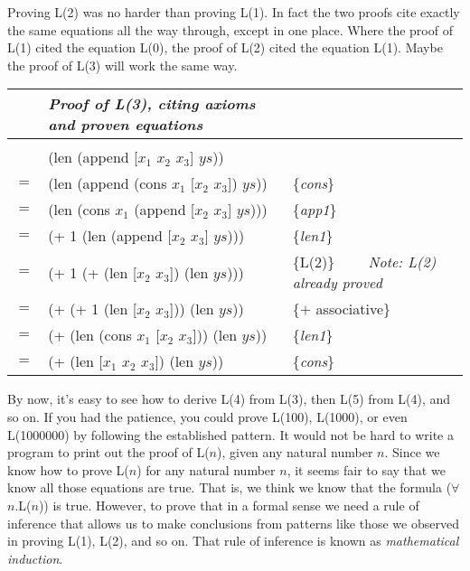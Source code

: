Proving L(2) was no harder than proving L(1).
In fact the two proofs cite exactly the same equations all the way through,
except in one place.
Where the proof of L(1) cited the equation L(0),
the proof of L(2) cited the equation L(1).
Maybe the proof of L(3) will work the same way.
\begin{center}
\begin{tabular}{lll}
&\emph{Proof of L(3), citing axioms and proven equations}&\\
\hline\\[-1.0em]
    & \textsf{(len (append [$x_1$ $x_2$ $x_3$] $ys$))}         &                     \\
$=$ & \textsf{(len (append (cons $x_1$ [$x_2$ $x_3$]) $ys$))}  & \{\emph{cons}\}     \\
$=$ & \textsf{(len (cons $x_1$ (append [$x_2$ $x_3$] $ys$)))}  & \{\emph{app1}\}     \\
$=$ & \textsf{(+ 1 (len (append [$x_2$ $x_3$] $ys$)))}         & \{\emph{len1}\}     \\
$=$ & \textsf{(+ 1 (+ (len [$x_2$ $x_3$]) (len $ys$)))}        & \{L(2)\} ~~~~\emph{Note: L(2) already proved}\\
$=$ & \textsf{(+ (+ 1 (len [$x_2$ $x_3$])) (len $ys$))}        & \{$+$ associative\} \\
$=$ & \textsf{(+ (len (cons $x_1$ [$x_2$ $x_3$])) (len $ys$))} & \{\emph{len1}\}     \\
$=$ & \textsf{(+ (len [$x_1$ $x_2$ $x_3$]) (len $ys$))}        & \{\emph{cons}\}     \\
\end{tabular}
\end{center}

\label{induction-rationale}
By now, it's easy to see how to derive L(4) from L(3),
then L(5) from L(4), and so on.
If you had the patience, you could prove L(100), L(1000), or even L(1000000)
by following the established pattern.
It would not be hard to write a program to print out the proof of L($n$),
given any natural number $n$.
Since we know how to prove L($n$) for any natural number $n$,
it seems fair to say that we know all those equations are true.
That is, we think we know that the formula ($\forall$$n$.L($n$)) is true.
However, to prove that in a formal sense
we need a rule of inference that allows us to make conclusions
from patterns like those we observed in proving L(1), L(2), and so on.
That rule of inference is known as \emph{mathematical induction}.

